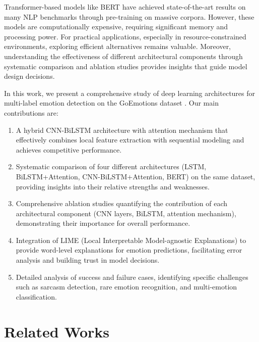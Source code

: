 \documentclass[12pt,a4paper]{article}
\begin{document}
Transformer-based models like BERT \cite{devlin2019bert} have achieved state-of-the-art results on many NLP benchmarks through pre-training on massive corpora. However, these models are computationally expensive, requiring significant memory and processing power. For practical applications, especially in resource-constrained environments, exploring efficient alternatives remains valuable. Moreover, understanding the effectiveness of different architectural components through systematic comparison and ablation studies provides insights that guide model design decisions.

In this work, we present a comprehensive study of deep learning architectures for multi-label emotion detection on the GoEmotions dataset \cite{demszky2020goemotions}. Our main contributions are:

\begin{enumerate}
    \item A hybrid CNN-BiLSTM architecture with attention mechanism that effectively combines local feature extraction with sequential modeling and achieves competitive performance.
    
    \item Systematic comparison of four different architectures (LSTM, BiLSTM+Attention, CNN-BiLSTM+Attention, BERT) on the same dataset, providing insights into their relative strengths and weaknesses.
    
    \item Comprehensive ablation studies quantifying the contribution of each architectural component (CNN layers, BiLSTM, attention mechanism), demonstrating their importance for overall performance.
    
    \item Integration of LIME (Local Interpretable Model-agnostic Explanations) \cite{ribeiro2020lime} to provide word-level explanations for emotion predictions, facilitating error analysis and building trust in model decisions.
    
    \item Detailed analysis of success and failure cases, identifying specific challenges such as sarcasm detection, rare emotion recognition, and multi-emotion classification.
\end{enumerate}

\section{Related Works}
\end{document}
